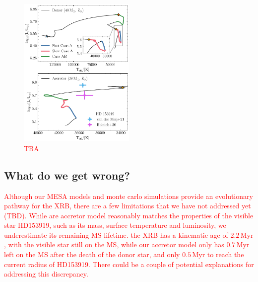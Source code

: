 \documentclass[linenumbers,trackchanges,twocolumn]{aastex701}
\newcommand{\red}{\textcolor{red}}
\begin{document}
\begin{figure}[htbp]
    \centering
    \includegraphics[width=0.5\textwidth]{xrb_fiducial_hr.pdf}
    \caption{\red{TBA}}
    \label{fig:xrb_fiducial_hr}
\end{figure}

\subsection{What do we get wrong?}

\red{Although our MESA models and monte carlo simulations provide an evolutionary pathway for the XRB, there are a few limitations that we have not addressed yet (TBD). While are accretor model reasonably matches the properties of the visible star HD153919, such as its mass, surface temperature and luminosity, we underestimate its remaining MS lifetime. the XRB has a kinematic age of $2.2\,\mathrm{Myr}$, with the visible star still on the MS, while our accretor model only has $0.7\,\mathrm{Myr}$ left on the MS after the death of the donor star, and only $0.5\,\mathrm{Myr}$ to reach the current radius of HD153919. There could be a couple of potential explanations for addressing this discrepancy.}
\end{document}
